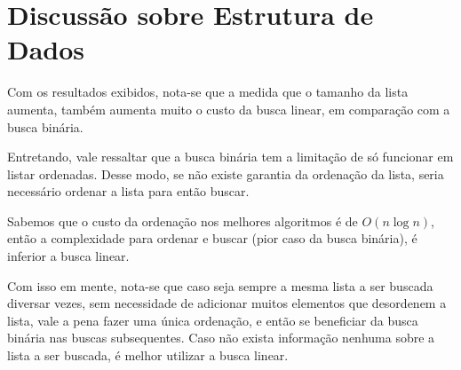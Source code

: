 \section{Discussão sobre Estrutura de Dados}

Com os resultados exibidos, nota-se que a medida que o tamanho da lista aumenta,
também aumenta muito o custo da busca linear, em comparação com a busca binária.

Entretando, vale ressaltar que a busca binária tem a limitação de só funcionar em
listar ordenadas. Desse modo, se não existe garantia da ordenação da lista, seria necessário
ordenar a lista para então buscar. 

Sabemos que o custo da ordenação nos melhores algoritmos é de $O(n \log n)$, então a complexidade
para ordenar e buscar (pior caso da busca binária), é inferior a busca linear. 

Com isso em mente, nota-se que caso seja sempre a mesma lista a ser buscada diversar vezes, sem 
necessidade de adicionar muitos elementos que desordenem a lista, vale a pena fazer uma única ordenação,
e então se beneficiar da busca binária nas buscas subsequentes. Caso não exista informação nenhuma sobre a 
lista a ser buscada, é melhor utilizar a busca linear.